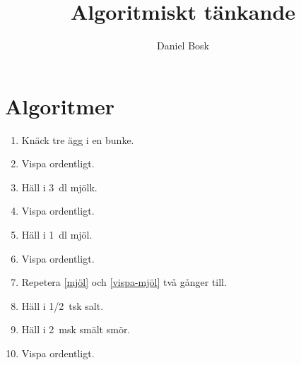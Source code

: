 \title{%
  Algoritmiskt tänkande
}
\author{Daniel Bosk}


\mode*

\begin{abstract}
  
\end{abstract}


\section{Algoritmer}


\begin{frame}
  \begin{example}
    \begin{enumerate}
      \item Knäck tre ägg i en bunke.
      \item Vispa ordentligt.
      \item Häll i \SI{3}{\deci\litre} mjölk.
      \item Vispa ordentligt.
      \item \label{mjöl} Häll i \SI{1}{\deci\litre} mjöl.
      \item \label{vispa-mjöl} Vispa ordentligt.
      \item Repetera \ref{mjöl} och \ref{vispa-mjöl} två gånger till.
      \item Häll i \SI{1/2}{tsk} salt.
      \item Häll i \SI{2}{msk} smält smör.
      \item Vispa ordentligt.
    \end{enumerate}
  \end{example}
\end{frame}

